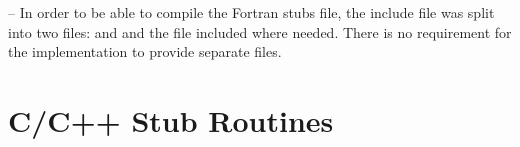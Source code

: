 \fortranspecificstart

\noteheader – In order to be able to compile the Fortran stubs file, the include file 
 was split into two files:  and  and the 
 file included where needed. There is no requirement for the 
implementation to provide separate files.

\fortranspecificend







\filbreak
\section{C/C++ Stub Routines}
\label{sec:C/C++ Stub Routines}
